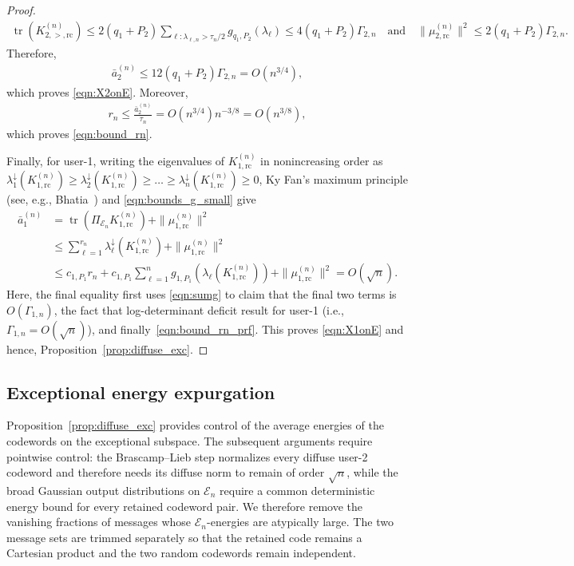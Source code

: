 \documentclass[11pt,onecolumn]{IEEEtran}
\newcommand{\nn}{\nonumber}
\newcommand{\calE}{\mathcal{E}}
\newcommand{\bara}{\bar{a}}
\DeclareMathOperator{\tr}{tr}
\newcommand{\rc}{\mathrm{rc}}
\begin{document}
\begin{proof}
\begin{align}
    \tr( K_{2,>,\rc}^{(n)}) \le 2(q_1+P_2)\sum_{\ell:\lambda_{\ell,n}>\tau_n/2} g_{q_1,P_2}(\lambda_\ell)\le 4(q_1+P_2)\Gamma_{2,n}\quad \mbox{and}\quad \|\mu_{2,\rc}^{(n)}\|^2 \le 2(q_1+P_2)\Gamma_{2,n}.
\end{align}
Therefore,
\begin{align}
    \bara_2^{(n)}\le 12(q_1+P_2)\Gamma_{2,n} = O(n^{3/4}),
\end{align}
which proves \eqref{eqn:X2onE}. Moreover, 
\begin{align}
    r_n \le \frac{\bara_2^{(n)}}{\tau_n}=  O(n^{3/4})  n^{- 3/8} =  O(n^{3/8}), \label{eqn:bound_rn_prf}
\end{align}
which proves \eqref{eqn:bound_rn}. 

Finally, for user-1, writing the eigenvalues of $K_{1,\rc}^{(n)}$ in nonincreasing order  as $\lambda_1^{\downarrow}(K_{1,\rc}^{(n)})\ge \lambda_2^{\downarrow}(K_{1,\rc}^{(n)})\ge\ldots\ge \lambda_n^{\downarrow}(K_{1,\rc}^{(n)})\ge0$,  Ky Fan's maximum principle (see, e.g., Bhatia~\cite{Bhatia1997}) and  \eqref{eqn:bounds_g_small} give
\begin{align}
    \bara_1^{(n)} &= \tr(\Pi_{\calE_n}K_{1,\rc}^{(n)})+ \| \mu_{1,\rc}^{(n)}\|^2\nn\\
    &\le \sum_{\ell=1}^{r_n}\lambda_\ell^{\downarrow}(K_{1,\rc}^{(n)}) + \| \mu_{1,\rc}^{(n)}\|^2 \nn\\
    &\le c_{1,P_1}r_n+c_{1,P_1}\sum_{\ell=1}^ng_{1,P_1} (\lambda_\ell (K_{1,\rc}^{(n)}) ) + \| \mu_{1,\rc}^{(n)}\|^2 = O(\sqrt{n}).
\end{align}
Here, the final equality first uses  \eqref{eqn:sumg} to claim that the final two terms is $O(\Gamma_{1,n})$, the fact that log-determinant deficit result for user-1  (i.e., $\Gamma_{1,n}=O(\sqrt{n})$), and finally~\eqref{eqn:bound_rn_prf}. This  proves \eqref{eqn:X1onE} and hence, Proposition~\ref{prop:diffuse_exc}.
\end{proof}

\subsection{Exceptional energy expurgation} \label{sec:energy_expurg}
Proposition~\ref{prop:diffuse_exc} provides control of the average energies of the codewords on the exceptional subspace. The subsequent arguments require pointwise control: the Brascamp--Lieb step normalizes every diffuse user-2
codeword and therefore needs its diffuse norm to remain of order $\sqrt{n}$, while the broad Gaussian output distributions on $\calE_n$ require a common deterministic energy bound for every retained codeword pair. We therefore remove the vanishing fractions of messages whose $\calE_n$-energies are atypically large. The two message sets are trimmed separately so that the retained code remains a Cartesian product and the two random codewords remain independent.
\end{document}
